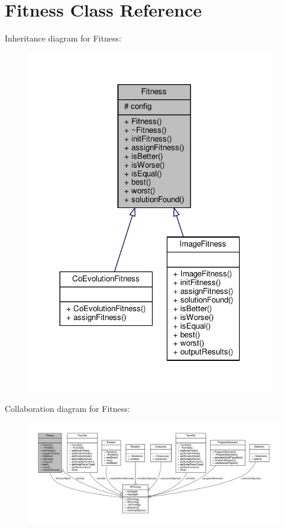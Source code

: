 \hypertarget{classFitness}{}\section{Fitness Class Reference}
\label{classFitness}


Inheritance diagram for Fitness\+:
\nopagebreak
\begin{figure}[H]
\begin{center}
\leavevmode
\includegraphics[width=308pt]{classFitness__inherit__graph}
\end{center}
\end{figure}


Collaboration diagram for Fitness\+:
\nopagebreak
\begin{figure}[H]
\begin{center}
\leavevmode
\includegraphics[width=350pt]{classFitness__coll__graph}
\end{center}
\end{figure}
